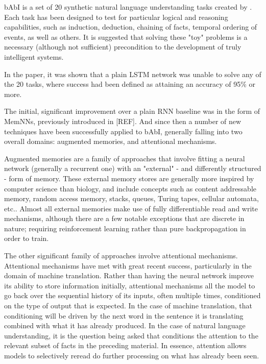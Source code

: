 \documentclass{article}
\begin{document}
bAbI is a set of 20 synthetic natural language understanding tasks created by \citet{2015arXiv150205698W}. Each task has been designed to test for particular logical and reasoning capabilities, such as induction, deduction, chaining of facts, temporal ordering of events, as well as others. It is suggested that solving these "toy" problems is a necessary (although not sufficient) precondition to the development of truly intelligent systems.

In the paper, it was shown that a plain LSTM network was unable to solve any of the 20 tasks, where success had been defined as attaining an accuracy of 95\% or more.

The initial, significant improvement over a plain RNN baseline was in the form of MemNNs, previously introduced in [REF]. And since then a number of new techniques have been successfully applied to bAbI, generally falling into two overall domains: augmented memories, and attentional mechanisms.

Augmented memories are a family of approaches that involve fitting a neural network (generally a recurrent one) with an "external" - and differently structured - form of memory. These external memory stores are generally more inspired by computer science than biology, and include concepts such as content addressable memory, random access memory, stacks, queues, Turing tapes, cellular automata, etc.. Almost all external memories make use of fully differentiable read and write mechanisms, although there are a few notable exceptions that are discrete in nature; requiring reinforcement learning rather than pure backpropagation in order to train.

The other significant family of approaches involve attentional mechanisms. Attentional mechanisms have met with great recent success, particularly in the domain of machine translation. Rather than having the neural network improve its ability to store information initially, attentional mechanisms all the model to go back over the sequential history of its inputs, often multiple times, conditioned on the type of output that is expected. In the case of machine translation, that conditioning will be driven by the next word in the sentence it is translating combined with what it has already produced. In the case of natural language understanding, it is the question being asked that conditions the attention to the relevant subset of facts in the preceding material. In essence, attention allows models to selectively reread do further processing on what has already been seen.
\end{document}

